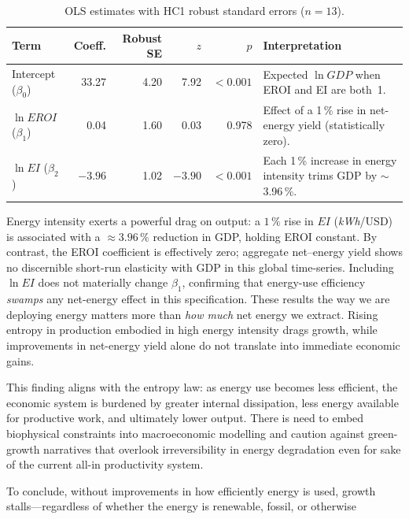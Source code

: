 \documentclass[a4paper,12pt]{article}
\begin{document}
\begin{table}[h]
  \centering
  \begin{tabularx}{\textwidth}{@{}l r r r r X@{}}
    \toprule
    \textbf{Term} & \textbf{Coeff.} & \textbf{Robust SE} & $z$ & $p$ & \textbf{Interpretation} \\ \midrule
    Intercept ($\beta_0$) &
      33.27 & 4.20 & 7.92 & $<\!0.001$ &
      Expected $\ln GDP$ when EROI and EI are both~1. \\
    $\ln EROI$ ($\beta_1$) &
      0.04 & 1.60 & 0.03 & 0.978 &
      Effect of a 1\,\% rise in net-energy yield (statistically zero). \\
    $\ln EI$ ($\beta_2$) &
      $-3.96$ & 1.02 & $-3.90$ & $<\!0.001$ &
      Each 1\,\% increase in energy intensity trims GDP by $\sim$3.96\,\%. \\
    \bottomrule
  \end{tabularx}
  \caption{OLS estimates with HC1 robust standard errors ($n=13$).}
  \label{tab:coefficients}
\end{table}
Energy intensity exerts a powerful drag on output:
a \(1\,\%\) rise in \(EI\) (\textit{kWh}/USD) is associated with a
\(\approx 3.96\,\%\) reduction in GDP, holding EROI constant.
By contrast, the EROI coefficient is effectively zero; aggregate
net--energy yield shows no discernible short-run elasticity with GDP in this
global time-series.  Including \(\ln EI\) does not materially change
\(\beta_{1}\), confirming that energy-use efficiency \emph{swamps} any
net-energy effect in this specification.
These results the way we are deploying energy matters more than \emph{how much} net energy we extract. Rising entropy in production embodied in high energy intensity drags growth, while improvements in net-energy yield alone do not translate into immediate economic gains. 

 This finding aligns with the entropy law: as energy use becomes less efficient, the economic system is burdened by greater internal dissipation, less energy available for productive work, and ultimately lower output. There is need to embed biophysical constraints into macroeconomic modelling and caution against green-growth narratives that overlook irreversibility in energy degradation even for sake of the current all-in productivity system.

To conclude, without improvements in how efficiently energy is used, growth stalls—regardless of whether the energy is renewable, fossil, or otherwise
\end{document}
